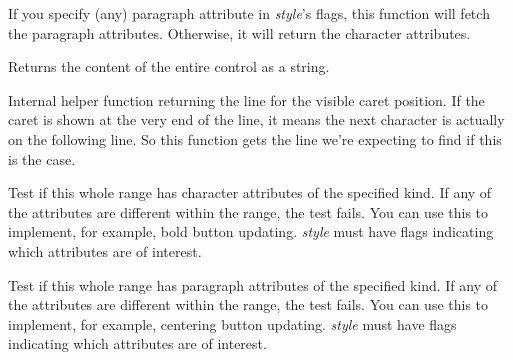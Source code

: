 If you specify (any) paragraph attribute in {\it style}'s flags, this function will fetch
the paragraph attributes. Otherwise, it will return the character attributes.

\label{wxrichtextctrlgetvalue}


Returns the content of the entire control as a string.

\label{wxrichtextctrlgetvisiblelineforcaretposition}


Internal helper function returning the line for the visible caret position. If the caret is
shown at the very end of the line, it means the next character is actually
on the following line. So this function gets the line we're expecting to find
if this is the case.

\label{wxrichtextctrlhascharacterattributes}



Test if this whole range has character attributes of the specified kind. If any
of the attributes are different within the range, the test fails. You
can use this to implement, for example, bold button updating. {\it style} must have
flags indicating which attributes are of interest.

\label{wxrichtextctrlhasparagraphattributes}



Test if this whole range has paragraph attributes of the specified kind. If any
of the attributes are different within the range, the test fails. You
can use this to implement, for example, centering button updating. {\it style} must have
flags indicating which attributes are of interest.

